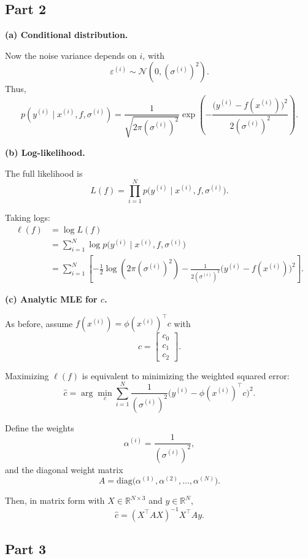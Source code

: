 \documentclass{article}
\begin{document}
\subsection{Part 2}

\textbf{(a) Conditional distribution.}

Now the noise variance depends on $i$, with
\[
	\varepsilon^{(i)} \sim \mathcal{N}(0, (\sigma^{(i)})^2).
\]
Thus,
\[
	p(y^{(i)} \mid x^{(i)}, f, \sigma^{(i)})
	= \frac{1}{\sqrt{2\pi(\sigma^{(i)})^2}}
	\exp\!\left( -\frac{\big(y^{(i)} - f(x^{(i)})\big)^2}{2(\sigma^{(i)})^2} \right).
\]

\textbf{(b) Log-likelihood.}

The full likelihood is
\[
	L(f) = \prod_{i=1}^N p\!\big(y^{(i)} \mid x^{(i)}, f, \sigma^{(i)}\big).
\]

Taking logs:
\begin{align*}
	\ell(f) & = \log L(f)                                                            \\
	        & = \sum_{i=1}^N \log p\!\big(y^{(i)} \mid x^{(i)}, f, \sigma^{(i)}\big) \\
	        & = \sum_{i=1}^N \left[
		-\tfrac{1}{2}\log(2\pi (\sigma^{(i)})^2)
		- \tfrac{1}{2(\sigma^{(i)})^2}\big(y^{(i)} - f(x^{(i)})\big)^2
		\right].
\end{align*}

\textbf{(c) Analytic MLE for $c$.}

As before, assume $f(x^{(i)}) = \phi(x^{(i)})^\top c$ with
\[
	c =
	\begin{bmatrix}
		c_0 \\ c_1 \\ c_2
	\end{bmatrix}.
\]

Maximizing $\ell(f)$ is equivalent to minimizing the weighted squared error:
\[
	\hat c = \arg\min_c \sum_{i=1}^N \frac{1}{(\sigma^{(i)})^2}
	\big(y^{(i)} - \phi(x^{(i)})^\top c\big)^2.
\]

Define the weights
\[
	\alpha^{(i)} = \frac{1}{(\sigma^{(i)})^2},
\]
and the diagonal weight matrix
\[
	A = \mathrm{diag}\!\big(\alpha^{(1)}, \alpha^{(2)}, \ldots, \alpha^{(N)}\big).
\]

Then, in matrix form with $X \in \mathbb{R}^{N \times 3}$ and $y \in \mathbb{R}^N$,
\[
	\hat c = (X^\top A X)^{-1} X^\top A y.
\]
\pagebreak
\subsection{Part 3}
\end{document}
